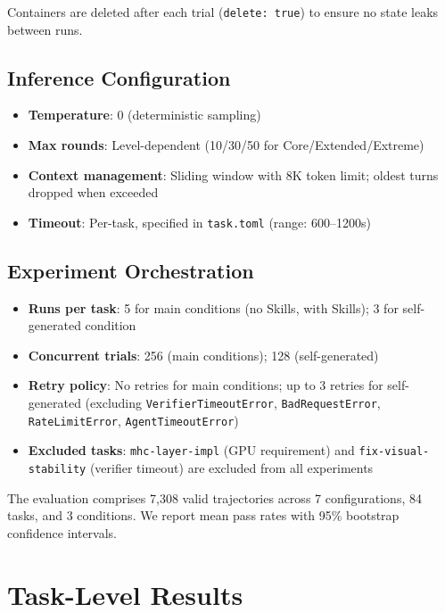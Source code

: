 \noindent Containers are deleted after each trial (\texttt{delete: true}) to ensure no state leaks between runs.

\subsection{Inference Configuration}

\begin{itemize}[nosep]
    \item \textbf{Temperature}: 0 (deterministic sampling)
    \item \textbf{Max rounds}: Level-dependent (10/30/50 for Core/Extended/Extreme)
    \item \textbf{Context management}: Sliding window with 8K token limit; oldest turns dropped when exceeded
    \item \textbf{Timeout}: Per-task, specified in \texttt{task.toml} (range: 600--1200s)
\end{itemize}

\subsection{Experiment Orchestration}

\begin{itemize}[nosep]
    \item \textbf{Runs per task}: 5 for main conditions (no Skills, with Skills); 3 for self-generated condition
    \item \textbf{Concurrent trials}: 256 (main conditions); 128 (self-generated)
    \item \textbf{Retry policy}: No retries for main conditions; up to 3 retries for self-generated (excluding \texttt{VerifierTimeoutError}, \texttt{BadRequestError}, \texttt{RateLimitError}, \texttt{AgentTimeoutError})
    \item \textbf{Excluded tasks}: \texttt{mhc-layer-impl} (GPU requirement) and \texttt{fix-visual-stability} (verifier timeout) are excluded from all experiments
\end{itemize}

\noindent The evaluation comprises 7,308 valid trajectories across 7 configurations, 84 tasks, and 3 conditions. We report mean pass rates with 95\% bootstrap confidence intervals.



\section{Task-Level Results}
\label{app:task-level}

